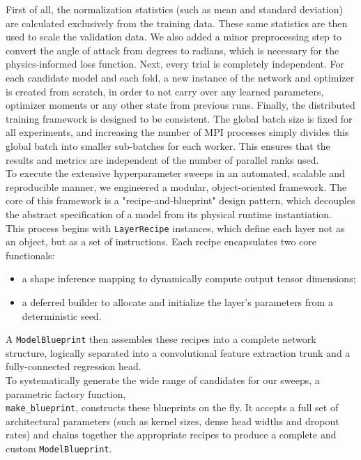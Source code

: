 First of all, the normalization statistics (such as mean and standard deviation) are calculated exclusively from the training data. These same statistics are then used to scale the validation data. We also added a minor preprocessing step to convert the angle of attack from degrees to radians, which is necessary for the physics-informed loss function. Next, every trial is completely independent. For each candidate model and each fold, a new instance of the network and optimizer is created from scratch, in order to not carry over any learned parameters, optimizer moments or any other state from previous runs. Finally, the distributed training framework is designed to be consistent. The global batch size is fixed for all experiments, and increasing the number of MPI processes simply divides this global batch into smaller sub-batches for each worker. This ensures that the results and metrics are independent of the number of parallel ranks used.\\

To execute the extensive hyperparameter sweeps in an automated, scalable and reproducible manner, we engineered a modular, object-oriented \cpp framework. The core of this framework is a "recipe-and-blueprint" design pattern, which decouples the abstract specification of a model from its physical runtime instantiation.\\

This process begins with \texttt{LayerRecipe} instances, which define each layer not as an object, but as a set of instructions. Each recipe encapsulates two core functionals:
\begin{itemize}
    \item[-] a shape inference mapping to dynamically compute output tensor dimensions;
    \item[-] a deferred builder to allocate and initialize the layer's parameters from a deterministic seed.
\end{itemize}
A \texttt{ModelBlueprint} then assembles these recipes into a complete network structure, logically separated into a convolutional feature extraction trunk and a fully-connected regression head.\\

To systematically generate the wide range of candidates for our sweeps, a parametric factory function, \\\texttt{make\_blueprint}, constructs these blueprints on the fly. It accepts a full set of architectural parameters (such as kernel sizes, dense head widths and dropout rates) and chains together the appropriate recipes to produce a complete and custom \texttt{ModelBlueprint}.\\

